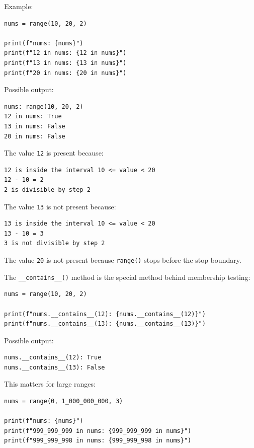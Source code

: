 Example:

\begin{verbatim}
nums = range(10, 20, 2)

print(f"nums: {nums}")
print(f"12 in nums: {12 in nums}")
print(f"13 in nums: {13 in nums}")
print(f"20 in nums: {20 in nums}")
\end{verbatim}

Possible output:

\begin{verbatim}
nums: range(10, 20, 2)
12 in nums: True
13 in nums: False
20 in nums: False
\end{verbatim}

The value \texttt{12} is present because:

\begin{verbatim}
12 is inside the interval 10 <= value < 20
12 - 10 = 2
2 is divisible by step 2
\end{verbatim}

The value \texttt{13} is not present because:

\begin{verbatim}
13 is inside the interval 10 <= value < 20
13 - 10 = 3
3 is not divisible by step 2
\end{verbatim}

The value \texttt{20} is not present because \texttt{range()} stops before the stop boundary.

The \texttt{\_\_contains\_\_()} method is the special method behind membership testing:

\begin{verbatim}
nums = range(10, 20, 2)

print(f"nums.__contains__(12): {nums.__contains__(12)}")
print(f"nums.__contains__(13): {nums.__contains__(13)}")
\end{verbatim}

Possible output:

\begin{verbatim}
nums.__contains__(12): True
nums.__contains__(13): False
\end{verbatim}

This matters for large ranges:

\begin{verbatim}
nums = range(0, 1_000_000_000, 3)

print(f"nums: {nums}")
print(f"999_999_999 in nums: {999_999_999 in nums}")
print(f"999_999_998 in nums: {999_999_998 in nums}")
\end{verbatim}

